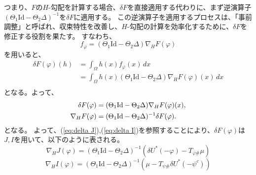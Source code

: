 つまり、$F$の$H$-勾配を計算する場合、$\delta F$を直接適用する代わりに、まず逆演算子$(\Theta_1 \text{Id} - \Theta_2\Delta)^{-1}$を$\delta F$に適用する。
この逆演算子を適用するプロセスは、「事前調整」と呼ばれ、収束特性を改善し、$H$-勾配の計算を効率化するために、$\delta F$を修正する役割を果たす。
すなわち、
\begin{equation*}
    f_\varphi = (\Theta_1 \text{Id} - \Theta_2 \Delta)\nabla_H F(\varphi)
\end{equation*}
を用いると、
\begin{align*}
    \delta F(\varphi)(h)   &= \int_\Omega h(x) f_\varphi(x) \, dx \\
                        &= \int_\Omega h(x)(\Theta_1 \text{Id} - \Theta_2 \Delta)\nabla_H F(\varphi)(x) \, dx \\
\end{align*}
となる。よって、
\begin{align}
    \label{eq:H-gradient}
    \delta F(\varphi)  &= (\Theta_1 \text{Id} - \Theta_2 \Delta)\nabla_H F(\varphi)(x),\notag\\
    \nabla_H F(\varphi) &= (\Theta_1 \text{Id} - \Theta_2 \Delta)^{-1} \delta F(\varphi).
\end{align}
となる。
よって、(\ref{eq:delta J}),(\ref{eq:delta I})を参照することにより、$\delta F(\varphi)$は$J, I$を用いて、以下のように表される。
\begin{equation}
    \label{eq:J-gradient}
    \nabla_H J(\varphi) = (\Theta_1 \text{Id} - \Theta_2 \Delta)^{-1} \left(\delta U^*(- \varphi) - T_{\varphi \#} \mu\right)
\end{equation}
\begin{equation}
    \label{eq:I-gradient}
    \nabla_H I(\varphi) = (\Theta_1 \text{Id} - \Theta_2 \Delta)^{-1}\left(\mu - T_{\psi \#} \delta U^* (- \psi^c)\right)
\end{equation}
